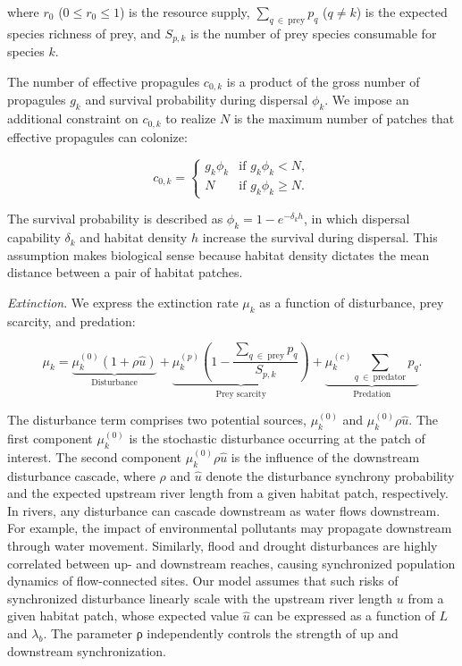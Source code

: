 \documentclass[11pt, class=article, crop=false]{standalone}
\begin{document}
where $r_0$ ($0 \le r_0 \le 1$) is the resource supply, $\sum_{q~\in~\text{prey}} p_{q}$ ($q \ne k$) is the expected species richness of prey, and $S_{p,k}$ is the number of prey species consumable for species $k$.

The number of effective propagules $c_{0,k}$ is a product of the gross number of propagules $g_k$ and survival probability during dispersal $\phi_k$.
We impose an additional constraint on $c_{0,k}$ to realize $N$ is the maximum number of patches that effective propagules can colonize:

\begin{equation}
    c_{0, k} = 
    \begin{cases}
        g_k \phi_k & \text{if $g_k \phi_k < N$},\\
        N & \text{if $g_k \phi_k \ge N$}.
    \end{cases}
    \label{eq:c0-prod}
\end{equation}

The survival probability is described as $\phi_k = 1 - e^{-\delta_k h}$, in which dispersal capability $\delta_k$ and habitat density $h$ increase the survival during dispersal.
This assumption makes biological sense because habitat density dictates the mean distance between a pair of habitat patches.

\textit{Extinction}. We express the extinction rate $\mu_k$ as a function of disturbance, prey scarcity, and predation:

\begin{equation}
    \mu_{k} = 
        \underbrace{\mu_{k}^{(0)} (1 + \rho \hat{u})}_{\text{Disturbance}} + 
        \underbrace{\mu_{k}^{(p)} \left(1 - \frac{\sum_{q~\in~\text{prey}} p_{q}}{S_{p, k}} \right)}_{\text{Prey scarcity}} + 
        \underbrace{\mu_{k}^{(c)} \sum_{q~\in~\text{predator}} p_{q}}_{\text{Predation}}.
    \label{eq:extn}    
\end{equation}

The disturbance term comprises two potential sources, $\mu^{(0)}_k$ and $\mu^{(0)}_k \rho \hat{u}$.
The first component $\mu^{(0)}_k$ is the stochastic disturbance occurring at the patch of interest.
The second component $\mu^{(0)}_k \rho \hat{u}$ is the influence of the downstream disturbance cascade, where $\rho$ and $\hat{u}$ denote the disturbance synchrony probability and the expected upstream river length from a given habitat patch, respectively.
In rivers, any disturbance can cascade downstream as water flows downstream.
For example, the impact of environmental pollutants may propagate downstream through water movement.
Similarly, flood and drought disturbances are highly correlated between up- and downstream reaches, causing synchronized population dynamics of flow-connected sites.
Our model assumes that such risks of synchronized disturbance linearly scale with the upstream river length $u$ from a given habitat patch, whose expected value $\hat{u}$ can be expressed as a function of $L$ and $\lambda_b$.
The parameter ρ independently controls the strength of up and
downstream synchronization.
\end{document}
